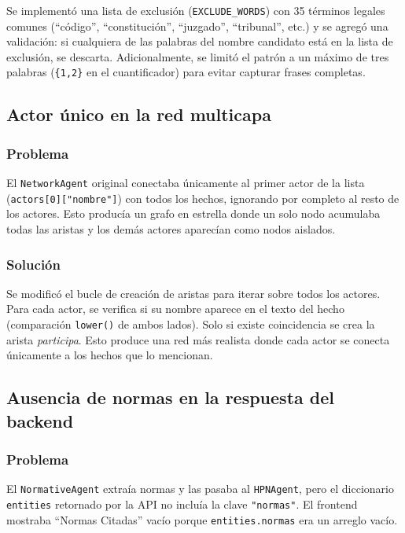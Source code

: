 \documentclass[12pt, letterpaper]{article}
\begin{document}
Se implementó una lista de exclusión (\texttt{EXCLUDE\_WORDS}) con 35
términos legales comunes (``código'', ``constitución'', ``juzgado'',
``tribunal'', etc.) y se agregó una validación: si cualquiera de las
palabras del nombre candidato está en la lista de exclusión, se
descarta. Adicionalmente, se limitó el patrón a un máximo de tres
palabras (\texttt{\{1,2\}} en el cuantificador) para evitar capturar
frases completas.

\subsection{Actor único en la red multicapa}

\subsubsection*{Problema}

El \texttt{NetworkAgent} original conectaba únicamente al primer actor
de la lista (\texttt{actors[0]["nombre"]}) con todos los hechos,
ignorando por completo al resto de los actores. Esto producía un
grafo en estrella donde un solo nodo acumulaba todas las aristas y
los demás actores aparecían como nodos aislados.

\subsubsection*{Solución}

Se modificó el bucle de creación de aristas para iterar sobre todos
los actores. Para cada actor, se verifica si su nombre aparece en el
texto del hecho (comparación \texttt{lower()} de ambos lados). Solo
si existe coincidencia se crea la arista \textit{participa}. Esto
produce una red más realista donde cada actor se conecta únicamente
a los hechos que lo mencionan.

\subsection{Ausencia de normas en la respuesta del backend}

\subsubsection*{Problema}

El \texttt{NormativeAgent} extraía normas y las pasaba al
\texttt{HPNAgent}, pero el diccionario \texttt{entities} retornado
por la API no incluía la clave \texttt{"normas"}. El frontend
mostraba ``Normas Citadas'' vacío porque \texttt{entities.normas}
era un arreglo vacío.
\end{document}

